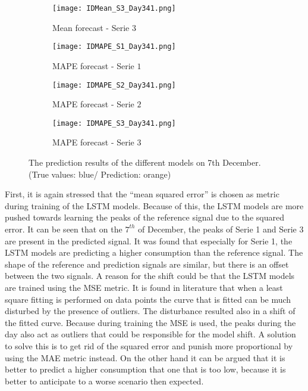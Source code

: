 \begin{figure}[ht]
	\begin{subfigure}{0.32\textwidth}
		\texttt{[image: IDMean\_S3\_Day341.png]}
		\caption{Mean forecast - Serie $ 3 $}
	\end{subfigure}
	 \begin{subfigure}{0.32\textwidth}
		\texttt{[image: IDMAPE\_S1\_Day341.png]}
		\caption{MAPE forecast - Serie $ 1 $}
	\end{subfigure}	 	
	\begin{subfigure}{0.32\textwidth}
		\texttt{[image: IDMAPE\_S2\_Day341.png]}
		\caption{MAPE forecast - Serie $ 2 $}
	\end{subfigure}	
	\begin{subfigure}{0.32\textwidth}
		\texttt{[image: IDMAPE\_S3\_Day341.png]}
		\caption{MAPE forecast - Serie $ 3 $}
	\end{subfigure}
 	\caption{The prediction results of the different models on 7th December. (True values: blue/ Prediction: orange)}
 	\label{fig:individual_forecasts}
 \end{figure}


First, it is again stressed that the ``mean squared error'' is chosen as metric during training of the LSTM models. Because of this, the LSTM models are more pushed towards learning the peaks of the reference signal due to the squared error. It can be seen that on the $ 7^{th} $ of December, the peaks of Serie 1 and Serie 3 are present in the predicted signal. It was found that especially for Serie 1, the LSTM models are predicting a higher consumption than the reference signal. The shape of the reference and prediction signals are similar, but there is an offset between the two signals. A reason for the shift could be that the LSTM models are trained using the MSE metric. It is found in literature that when a least square fitting is performed on data points the curve that is fitted can be much disturbed by the presence of outliers. The disturbance resulted also in a shift of the fitted curve. Because during training the MSE is used, the peaks during the day also act as outliers that could be responsible for the model shift. A solution to solve this is to get rid of the squared error and punish more proportional by using the MAE metric instead. On the other hand it can be argued that it is better to predict a higher consumption that one that is too low, because it is better to anticipate to a worse scenario then expected.\\

